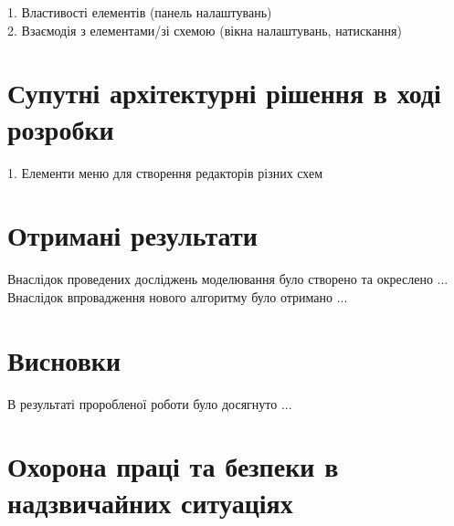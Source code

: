 \documentclass[12pt,a4paper]{article}
\begin{document}
1. Властивості елементів (панель налаштувань)\\
2. Взаємодія з елементами/зі схемою (вікна налаштувань, натискання)

\clearpage

\section{Супутні архітектурні рішення в ході розробки}

1. Елементи меню для створення редакторів різних схем

\clearpage

\section{Отримані результати}

Внаслідок проведених досліджень моделювання було створено та окреслено ...\\
Внаслідок впровадження нового алгоритму було отримано ...\cite{web}

\clearpage

\section{Висновки}

В результаті проробленої роботи було досягнуто ...\cite{web}

\clearpage

\section{Охорона праці та безпеки в надзвичайних ситуаціях}
\end{document}
